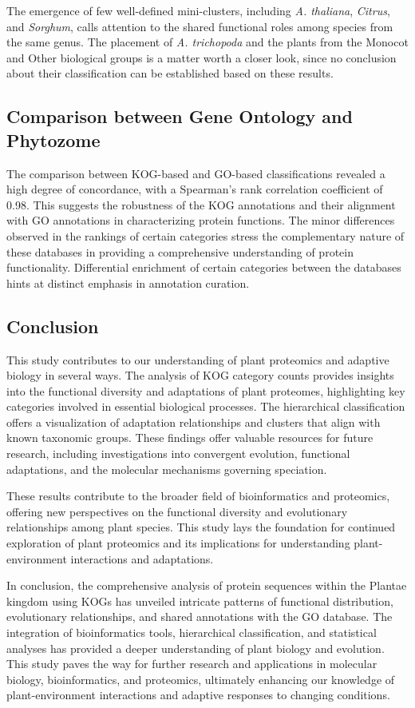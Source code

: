 The emergence of few well-defined mini-clusters, including 
\emph{A. thaliana}, \emph{Citrus}, and \emph{Sorghum}, 
calls attention to the shared functional roles among 
species from the same genus. The placement of 
\emph{A. trichopoda} and the plants from the Monocot and 
Other biological groups is a matter worth a closer look, 
since no conclusion about their classification can be 
established based on these results.


\subsection{Comparison between Gene Ontology and Phytozome}
\label{sec:conclusion.comparison}

The comparison between KOG-based and GO-based 
classifications revealed a high degree of concordance, 
with a Spearman's rank correlation coefficient of 0.98. 
This suggests the robustness of the KOG annotations and 
their alignment with GO annotations in characterizing 
protein functions. The minor differences observed in the 
rankings of certain categories stress the complementary 
nature of these databases in providing a comprehensive 
understanding of protein functionality. Differential 
enrichment of certain categories between the databases 
hints at distinct emphasis in annotation curation.


\subsection{Conclusion}
\label{sec:conclusion.conclusion}

This study contributes to our understanding of plant 
proteomics and adaptive biology in several ways. The 
analysis of KOG category counts provides insights into 
the functional diversity and adaptations of plant 
proteomes, highlighting key categories involved in 
essential biological processes. The hierarchical 
classification offers a visualization of adaptation 
relationships and clusters that align with known 
taxonomic groups. These findings offer valuable 
resources for future research, including investigations 
into convergent evolution, functional adaptations, and the 
molecular mechanisms governing speciation.

These results contribute to the broader field of 
bioinformatics and proteomics, offering new perspectives on 
the functional diversity and evolutionary relationships 
among plant species. This study lays the foundation for 
continued exploration of plant proteomics and its 
implications for understanding plant-environment 
interactions and adaptations.

In conclusion, the comprehensive analysis of protein 
sequences within the Plantae kingdom using KOGs has 
unveiled intricate patterns of functional distribution, 
evolutionary relationships, and shared annotations with 
the GO database. The integration of bioinformatics tools, 
hierarchical classification, and statistical analyses has 
provided a deeper understanding of plant biology and evolution. 
This study paves the way for further research and 
applications in molecular biology, bioinformatics, and 
proteomics, ultimately enhancing our knowledge of 
plant-environment interactions and adaptive responses to 
changing conditions.
